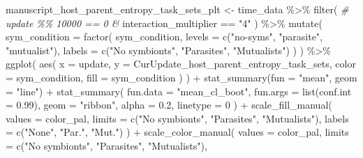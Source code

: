 \documentclass[
]{book}
\newenvironment{Shaded}{\begin{snugshade}}{\end{snugshade}}
\newcommand{\AttributeTok}[1]{\textcolor[rgb]{0.77,0.63,0.00}{#1}}
\newcommand{\CommentTok}[1]{\textcolor[rgb]{0.56,0.35,0.01}{\textit{#1}}}
\newcommand{\DecValTok}[1]{\textcolor[rgb]{0.00,0.00,0.81}{#1}}
\newcommand{\FloatTok}[1]{\textcolor[rgb]{0.00,0.00,0.81}{#1}}
\newcommand{\FunctionTok}[1]{\textcolor[rgb]{0.00,0.00,0.00}{#1}}
\newcommand{\NormalTok}[1]{#1}
\newcommand{\OtherTok}[1]{\textcolor[rgb]{0.56,0.35,0.01}{#1}}
\newcommand{\SpecialCharTok}[1]{\textcolor[rgb]{0.00,0.00,0.00}{#1}}
\newcommand{\StringTok}[1]{\textcolor[rgb]{0.31,0.60,0.02}{#1}}
\begin{document}
\begin{Shaded}
\begin{Highlighting}[]
\NormalTok{manuscript\_host\_parent\_entropy\_task\_sets\_plt }\OtherTok{\textless{}{-}}\NormalTok{ time\_data }\SpecialCharTok{\%\textgreater{}\%}
  \FunctionTok{filter}\NormalTok{(}
    \CommentTok{\# update \%\% 10000 == 0 \&}
\NormalTok{    interaction\_multiplier }\SpecialCharTok{==} \StringTok{"4"}
\NormalTok{  ) }\SpecialCharTok{\%\textgreater{}\%}
  \FunctionTok{mutate}\NormalTok{(}
    \AttributeTok{sym\_condition =} \FunctionTok{factor}\NormalTok{(}
\NormalTok{      sym\_condition,}
      \AttributeTok{levels =} \FunctionTok{c}\NormalTok{(}\StringTok{"no{-}syms"}\NormalTok{, }\StringTok{"parasite"}\NormalTok{, }\StringTok{"mutualist"}\NormalTok{),}
      \AttributeTok{labels =} \FunctionTok{c}\NormalTok{(}\StringTok{"No symbionts"}\NormalTok{, }\StringTok{"Parasites"}\NormalTok{, }\StringTok{"Mutualists"}\NormalTok{)}
\NormalTok{    )}
\NormalTok{  ) }\SpecialCharTok{\%\textgreater{}\%}
  \FunctionTok{ggplot}\NormalTok{(}
    \FunctionTok{aes}\NormalTok{(}
      \AttributeTok{x =}\NormalTok{ update,}
      \AttributeTok{y =}\NormalTok{ CurUpdate\_host\_parent\_entropy\_task\_sets,}
      \AttributeTok{color =}\NormalTok{ sym\_condition,}
      \AttributeTok{fill =}\NormalTok{ sym\_condition}
\NormalTok{    )}
\NormalTok{  ) }\SpecialCharTok{+}
  \FunctionTok{stat\_summary}\NormalTok{(}\AttributeTok{fun =} \StringTok{"mean"}\NormalTok{, }\AttributeTok{geom =} \StringTok{"line"}\NormalTok{) }\SpecialCharTok{+}
  \FunctionTok{stat\_summary}\NormalTok{(}
    \AttributeTok{fun.data =} \StringTok{"mean\_cl\_boot"}\NormalTok{,}
    \AttributeTok{fun.args =} \FunctionTok{list}\NormalTok{(}\AttributeTok{conf.int =} \FloatTok{0.99}\NormalTok{),}
    \AttributeTok{geom =} \StringTok{"ribbon"}\NormalTok{,}
    \AttributeTok{alpha =} \FloatTok{0.2}\NormalTok{,}
    \AttributeTok{linetype =} \DecValTok{0}
\NormalTok{  ) }\SpecialCharTok{+}
  \FunctionTok{scale\_fill\_manual}\NormalTok{(}
    \AttributeTok{values =}\NormalTok{ color\_pal,}
    \AttributeTok{limits =} \FunctionTok{c}\NormalTok{(}\StringTok{"No symbionts"}\NormalTok{, }\StringTok{"Parasites"}\NormalTok{, }\StringTok{"Mutualists"}\NormalTok{),}
    \AttributeTok{labels =} \FunctionTok{c}\NormalTok{(}\StringTok{"None"}\NormalTok{, }\StringTok{"Par."}\NormalTok{, }\StringTok{"Mut."}\NormalTok{)}
\NormalTok{  ) }\SpecialCharTok{+}
  \FunctionTok{scale\_color\_manual}\NormalTok{(}
    \AttributeTok{values =}\NormalTok{ color\_pal,}
    \AttributeTok{limits =} \FunctionTok{c}\NormalTok{(}\StringTok{"No symbionts"}\NormalTok{, }\StringTok{"Parasites"}\NormalTok{, }\StringTok{"Mutualists"}\NormalTok{),}

\end{Highlighting}
\end{Shaded}
\end{document}
